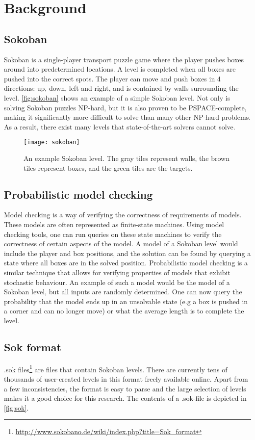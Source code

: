 \section{Background}
\subsection{Sokoban}
Sokoban is a single-player transport puzzle game where the player pushes boxes around into predetermined locations. A level is completed when all boxes are pushed into the correct spots. The player can move and push boxes in 4 directions: up, down, left and right, and is contained by walls surrounding the level. \autoref{fig:sokoban} shows an example of a simple Sokoban level. Not only is solving Sokoban puzzles NP-hard, but it is also proven to be PSPACE-complete\cite{pspace-complete}, making it significantly more difficult to solve than many other NP-hard problems. As a result, there exist many levels that state-of-the-art solvers cannot solve. 

\begin{figure}[h]
    \centering
    \texttt{[image: sokoban]}
    \caption{An example Sokoban level. The gray tiles represent walls, the brown tiles represent boxes, and the green tiles are the targets.}
    \label{fig:sokoban}
\end{figure}

\subsection{Probabilistic model checking}
Model checking is a way of verifying the correctness of requirements of models. These models are often represented as finite-state machines. Using model checking tools, one can run queries on these state machines to verify the correctness of certain aspects of the model. A model of a Sokoban level would include the player and box positions, and the solution can be found by querying a state where all boxes are in the solved position. Probabilistic model checking is a similar technique that allows for verifying properties of models that exhibit stochastic behaviour. An example of such a model would be the model of a Sokoban level, but all inputs are randomly determined. One can now query the probability that the model ends up in an unsolvable state (e.g a box is pushed in a corner and can no longer move) or what the average length is to complete the level.

\subsection{Sok format}
.sok files\footnote{\url{http://www.sokobano.de/wiki/index.php?title=Sok_format}} are files that contain Sokoban levels. There are currently tens of thousands of user-created levels in this format freely available online. Apart from a few inconsistencies, the format is easy to parse and the large selection of levels makes it a good choice for this research. The contents of a .sok-file is depicted in \autoref{fig:sok}.

